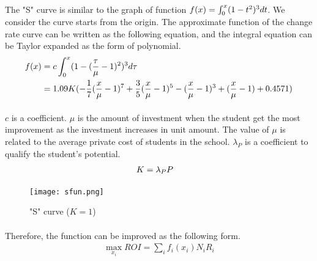 \documentclass{mcmthesis}
\begin{document}
\paragraph{} The "S" curve is similar to the graph of function $f(x)=\*\int_{0}^{x}(1-t^2)^3\*dt$. We consider the curve starts from the origin. The approximate function of the change rate curve can be written as the following equation, and the integral equation can be Taylor expanded as the form of polynomial. 
\begin{align}
f(x)&=c\*\int_{0}^{x}(1-(\frac{\tau}{\mu}-1)^2)^3\*d\tau\\
&=1.09\*K\*(-\frac{1}{7}(\frac{x}{\mu}-1)^7+\frac{3}{5}(\frac{x}{\mu}-1)^5-(\frac{x}{\mu}-1)^3+(\frac{x}{\mu}-1)+0.4571) \label{sfun}\\
\end{align}
\paragraph{} $c$ is a coefficient. $\mu$ is the amount of investment when the student get the most improvement as the investment increases in unit amount. The value of $\mu$ is related to the average private cost of students in the school. $\lambda_P$ is a coefficient to qualify the student's potential.
\begin{align}
K&=\*\lambda_P\*P
\end{align}

\begin{figure}[H]
\centering
\texttt{[image: sfun.png]}
\caption{"S" curve ($K=1$)}
\label{arch}
\end{figure}

\paragraph{}  Therefore, the function can be improved as the following form.
\begin{align}
\max_{x_i} ROI= \sum_i f_i(x_i) N_i R_i \label{}
\end{align}
\end{document}
